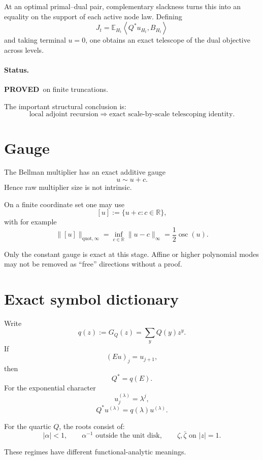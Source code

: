 \documentclass[11pt,a4paper]{article}
\newcommand{\E}{\mathbb E}
\newcommand{\R}{\mathbb R}
\newcommand{\quot}{\mathrm{quot}}
\newcommand{\osc}{\operatorname{osc}}
\newcommand{\PROVED}{\textcolor{green!45!black}{\textbf{PROVED}}}
\begin{document}
At an optimal primal--dual pair, complementary slackness turns this into an
equality on the support of each active node law.
Defining
\[
J_t
=
\E_{H_t}
\left\langle Q^*u_{H_t},B_{H_t}\right\rangle
\]
and taking terminal \(u=0\), one obtains an exact telescope of the dual
objective across levels.

\paragraph{Status.}
\PROVED\ on finite truncations.

The important structural conclusion is:
\[
\boxed{
\text{local adjoint recursion}
\Longrightarrow
\text{exact scale-by-scale telescoping identity}.
}
\]

\section{Gauge}

The Bellman multiplier has an exact additive gauge
\[
u\sim u+c.
\]
Hence raw multiplier size is not intrinsic.

On a finite coordinate set one may use
\[
[u]:=\{u+c:c\in\R\},
\]
with for example
\[
\boxed{
\|[u]\|_{\quot,\infty}
=
\inf_{c\in\R}\|u-c\|_\infty
=
\frac12\osc(u).
}
\tag{16}
\]

Only the constant gauge is exact at this stage.
Affine or higher polynomial modes may not be removed as ``free'' directions
without a proof.

\section{Exact symbol dictionary}

Write
\[
q(z):=G_Q(z)=\sum_yQ(y)z^y.
\]
If
\[
(Eu)_j=u_{j+1},
\]
then
\[
\boxed{
Q^*=q(E).
}
\tag{17}
\]
For the exponential character
\[
u^{(\lambda)}_j=\lambda^j,
\]
\[
\boxed{
Q^*u^{(\lambda)}
=
q(\lambda)u^{(\lambda)}.
}
\tag{18}
\]

For the quartic \(Q\), the roots consist of:
\[
|\alpha|<1,
\qquad
\alpha^{-1}\text{ outside the unit disk},
\qquad
\zeta,\bar\zeta\text{ on }|z|=1.
\]

These regimes have different functional-analytic meanings.
\end{document}
